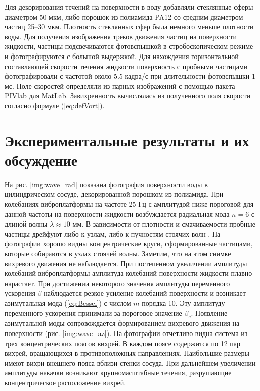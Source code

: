 Для декорирования течений на поверхности в воду добавляли стеклянные сферы диаметром 50 мкм, либо порошок из полиамида PA12 со средним диаметром частиц 25–30 мкм. Плотность стеклянных сфер была немного меньше плотности воды. Для получения изображения треков движения частиц на поверхности жидкости, частицы подсвечиваются фотовспышкой в стробоскопическом режиме и фотографируются с большой выдержкой. Для нахождения горизонтальной составляющей скорости течения жидкости поверхность с пробными частицами фотографировали с частотой около 5.5 кадра/с при длительности фотовспышки 1 мс. Поле скоростей определяли из парных изображений с помощью пакета PIVlab \cite{PIVlab, PIVlab1} для MatLab. 
Завихренность вычислялась из полученного поля скорости согласно формуле (\ref{eq:defVort}).


\section{Экспериментальные результаты и их обсуждение} \label{sect3_3} 
На рис. \ref{img:wave_rad} показана фотография поверхности воды в цилиндрическом сосуде, декорированной порошком из полиамида. При колебаниях виброплатформы на частоте 25 Гц с амплитудой ниже пороговой для данной частоты на поверхности жидкости возбуждается радиальная мода $n = 6$ с длиной волны $\lambda \approx 10$ мм. В зависимости от плотности и смачиваемости пробные частицы дрейфуют либо к узлам, либо к пучностям стоячих волн \cite{Lukaschuk2007}. На фотографии хорошо видны концентрические круги, сформированные частицами, которые собираются в узлах стоячей волны. Заметим, что на этом снимке вихревого движения не наблюдается. При постепенном увеличении амплитуды колебаний виброплатформы амплитуда колебаний поверхности жидкости плавно нарастает. При достижении некоторого значения амплитуды переменного ускорения $\beta$ наблюдается резкое усиление колебаний поверхности и возникает азимутальная мода (\ref{eq:Bessel}) с числом $m$ порядка 10. Эту амплитуду переменного ускорения принимали за пороговое значение $\beta_c$. Появление азимутальной моды сопровождается формированием вихревого движения на поверхности (рис. \ref{img:wave_az}). На фотографии отчетливо видна система из трех концентрических поясов вихрей. В каждом поясе содержится по 12 пар вихрей, вращающихся в противоположных направлениях. Наибольшие размеры имеют вихри внешнего пояса вблизи стенки сосуда. При дальнейшем увеличении амплитуды накачки возникают крупномасштабные течения, разрушающие концентрическое расположение вихрей.

